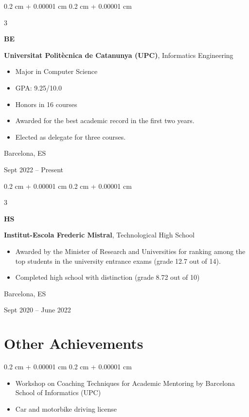 \documentclass[10pt, letterpaper]{article}
\newenvironment{highlights}{
    \begin{itemize}[
        topsep=0.10 cm,
        parsep=0.10 cm,
        partopsep=0pt,
        itemsep=0pt,
        leftmargin=0.4 cm + 10pt
    ]
}{
    \end{itemize}
} %
\newenvironment{highlightsforbulletentries}{
    \begin{itemize}[
        topsep=0.10 cm,
        parsep=0.10 cm,
        partopsep=0pt,
        itemsep=0pt,
        leftmargin=10pt
    ]
}{
    \end{itemize}
} %
\newenvironment{onecolentry}{
    \begin{adjustwidth}{
        0.2 cm + 0.00001 cm
    }{
        0.2 cm + 0.00001 cm
    }
}{
    \end{adjustwidth}
} %
\newenvironment{threecolentry}[3][]{
    \onecolentry
    \def\thirdColumn{#3}
    \setcolumnwidth{1 cm, \fill, 4.5 cm}
    \begin{paracol}{3}
    {\raggedright #2} \switchcolumn
}{
    \switchcolumn \raggedleft \thirdColumn
    \end{paracol}
    \endonecolentry
} %
\begin{document}
        \begin{threecolentry}{\textbf{BE}}{
            Barcelona, ES
            
            Sept 2022 – Present
        }
            \textbf{Universitat Politècnica de Catanunya (UPC)}, Informatics Engineering
            \begin{highlights}
                \item Major in Computer Science
                \item GPA: 9.25/10.0
                \item Honors in 16 courses
                \item Awarded for the best academic record  in the first two years.
                \item Elected as delegate for three courses.
            \end{highlights}
        \end{threecolentry}

        \vspace{0.2 cm}

        \begin{threecolentry}{\textbf{HS}}{
            Barcelona, ES
            
            Sept 2020 – June 2022
        }
            \textbf{Institut-Escola Frederic Mistral}, Technological High School
            \begin{highlights}
                \item Awarded by the Minister of Research and Universities for ranking among the top students in the university entrance exams (grade 12.7 out of 14).
                \item Completed high school with distinction (grade 8.72 out of 10)
            \end{highlights}
        \end{threecolentry}
        
    
    \section{Other Achievements}
        \begin{onecolentry}
            \begin{highlightsforbulletentries}
                \item Workshop on Coaching Techniques for Academic Mentoring by Barcelona School of Informatics (UPC)
                \item Car and motorbike driving license
            \end{highlightsforbulletentries}
        \end{onecolentry}
\end{document}
